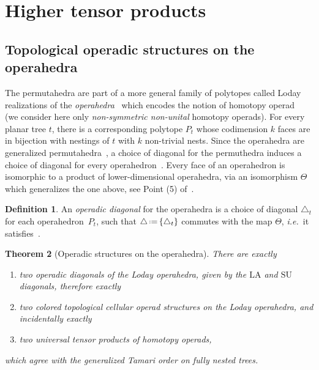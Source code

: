 \documentclass{amsart}
\newtheorem{theorem}{Theorem}[section]
\theoremstyle{definition}
\newtheorem{definition}[theorem]{Definition}
\newcommand{\eqdef}{\mbox{\,\raisebox{0.2ex}{\scriptsize\ensuremath{\mathrm:}}\ensuremath{=}\,}} %
\newcommand{\ie}{\textit{i.e.}~} %
\newcommand{\SU}{\mathrm{SU}}
\newcommand{\LA}{\mathrm{LA}}
\begin{document}
\section{Higher tensor products}


\subsection{Topological operadic structures on the operahedra}
\label{subsec:top-operadic-structures}

The permutahedra are part of a more general family of polytopes called Loday realizations of the \emph{operahedra}~\cite[Def.~2.9]{LaplanteAnfossi} which encodes the notion of homotopy operad~\cite[Def.~4.11]{LaplanteAnfossi} (we consider here only \emph{non-symmetric non-unital} homotopy operads).
For every planar tree $t$, there is a corresponding polytope $P_t$ whose codimension $k$ faces are in bijection with nestings of $t$ with $k$ non-trivial nests.
Since the operahedra are generalized permutahedra~\cite[Coro.~2.16]{LaplanteAnfossi}, a choice of diagonal for the permuthedra induces a choice of diagonal for every operahedron~\cite[Coro.~1.31]{LaplanteAnfossi}.
Every face of an operahedron is isomorphic to a product of lower-dimensional operahedra, via an isomorphism $\Theta$ which generalizes the one above, see Point (5) of~\cite[Prop.~2.3]{LaplanteAnfossi}.

\begin{definition}
An \emph{operadic diagonal} for the operahedra is a choice of diagonal $\triangle_t$ for each operahedron~$P_t$, such that $\triangle \eqdef \{\triangle_t\}$ commutes with the map $\Theta$, \ie it satisfies~\cite[Prop.~4.14]{LaplanteAnfossi}.
\end{definition}

\begin{theorem}[Operadic structures on the operahedra] 
\label{thm:operahedra}
There are exactly 
\begin{enumerate}
\item two operadic diagonals of the Loday operahedra, given by the $\LA$ and $\SU$ diagonals, therefore exactly
\item two colored topological cellular operad structures on the Loday operahedra, and incidentally exactly
\item two universal tensor products of homotopy operads,
\end{enumerate}
which agree with the generalized Tamari order on fully nested trees. 
\end{theorem}
\end{document}
